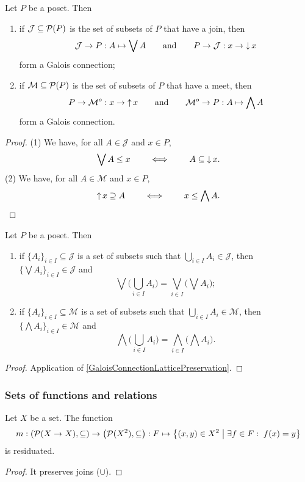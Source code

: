 \begin{proposition}
Let $P$ be a poset. Then
\begin{enumerate}
\item if $\mathcal{J}\subseteq \operatorname{\mathcal{P}}(P)$ is the set of subsets of $P$ that have a join, then
\[ \mathcal{J} \to P: A\mapsto \bigvee A \qquad\text{and}\qquad P\to \mathcal{J}: x\to \operatorname{\downarrow} x \]
form a Galois connection;
\item if $\mathcal{M}\subseteq \operatorname{\mathcal{P}}(P)$ is the set of subsets of $P$ that have a meet, then
\[ P\to \mathcal{M}^o: x\to \operatorname{\uparrow} x \qquad\text{and}\qquad \mathcal{M}^o \to P: A\mapsto \bigwedge A \]
form a Galois connection. 
\end{enumerate}
\end{proposition}
\begin{proof}
(1) We have, for all $A\in \mathcal{J}$ and $x\in P$,
\[ \bigvee A \leq x \qquad \iff\qquad A\subseteq \operatorname{\downarrow} x. \]
(2) We have, for all $A\in \mathcal{M}$ and $x\in P$,
\[ \operatorname{\uparrow} x \supseteq A \qquad \iff\qquad x\leq \bigwedge A. \]
\end{proof}
\begin{corollary} \label{joinMeetUnion}
Let $P$ be a poset. Then
\begin{enumerate}
\item if $\{A_i\}_{i\in I}\subseteq \mathcal{J}$ is a set of subsets such that $\bigcup_{i\in I}A_i \in \mathcal{J}$, then $\big\{\bigvee A_i\big\}_{i\in I} \in \mathcal{J}$ and
\[ \bigvee \Big(\bigcup_{i\in I}A_i\Big) = \bigvee_{i\in I}\Big(\bigvee A_i\Big); \]
\item if $\{A_i\}_{i\in I}\subseteq \mathcal{M}$ is a set of subsets such that $\bigcup_{i\in I}A_i \in \mathcal{M}$, then $\big\{\bigwedge A_i\big\}_{i\in I} \in \mathcal{M}$ and
\[ \bigwedge \Big(\bigcup_{i\in I}A_i\Big) = \bigwedge_{i\in I}\Big(\bigwedge A_i\Big). \]
\end{enumerate}
\end{corollary}
\begin{proof}
Application of \ref{GaloisConnectionLatticePreservation}.
\end{proof}

\subsubsection{Sets of functions and relations}
\begin{proposition} \label{setOfFunctionsToRelationGaloisConnection}
Let $X$ be a set. The function
\[ m: \left( \operatorname{\mathcal{P}}(X\to X), \subseteq \right) \to \left( \operatorname{\mathcal{P}}(X^2), \subseteq \right): F \mapsto \left\{ (x,y)\in X^2 \;\middle|\; \exists f\in F: \; f(x) = y \right\} \]
is residuated.
\end{proposition}
\begin{proof}
It preserves joins ($\cup$).
\end{proof}

